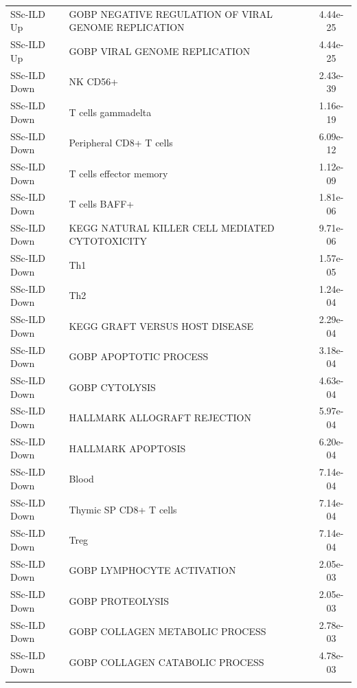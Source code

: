 \documentclass[
]{article}
\begin{document}
\begin{singlespace}
\begin{longtable}[t]{>{\raggedright\arraybackslash}p{1.0in}>{\raggedright\arraybackslash}p{4.5in}c}
SSc-ILD Up & GOBP NEGATIVE REGULATION OF VIRAL GENOME REPLICATION & 4.44e-25\\
SSc-ILD Up & GOBP VIRAL GENOME REPLICATION & 4.44e-25\\
\addlinespace
SSc-ILD Down & NK CD56+ & 2.43e-39\\
SSc-ILD Down & T cells gammadelta & 1.16e-19\\
SSc-ILD Down & Peripheral CD8+ T cells & 6.09e-12\\
SSc-ILD Down & T cells effector memory & 1.12e-09\\
SSc-ILD Down & T cells BAFF+ & 1.81e-06\\
\addlinespace
SSc-ILD Down & KEGG NATURAL KILLER CELL MEDIATED CYTOTOXICITY & 9.71e-06\\
SSc-ILD Down & Th1 & 1.57e-05\\
SSc-ILD Down & Th2 & 1.24e-04\\
SSc-ILD Down & KEGG GRAFT VERSUS HOST DISEASE & 2.29e-04\\
SSc-ILD Down & GOBP APOPTOTIC PROCESS & 3.18e-04\\
\addlinespace
SSc-ILD Down & GOBP CYTOLYSIS & 4.63e-04\\
SSc-ILD Down & HALLMARK ALLOGRAFT REJECTION & 5.97e-04\\
SSc-ILD Down & HALLMARK APOPTOSIS & 6.20e-04\\
SSc-ILD Down & Blood & 7.14e-04\\
SSc-ILD Down & Thymic SP CD8+ T cells & 7.14e-04\\
\addlinespace
SSc-ILD Down & Treg & 7.14e-04\\
SSc-ILD Down & GOBP LYMPHOCYTE ACTIVATION & 2.05e-03\\
SSc-ILD Down & GOBP PROTEOLYSIS & 2.05e-03\\
SSc-ILD Down & GOBP COLLAGEN METABOLIC PROCESS & 2.78e-03\\
SSc-ILD Down & GOBP COLLAGEN CATABOLIC PROCESS & 4.78e-03\\*
\end{longtable}
\endgroup{}

\pagebreak



\begingroup\fontsize{8}{10}\selectfont


\end{singlespace}
\end{document}
